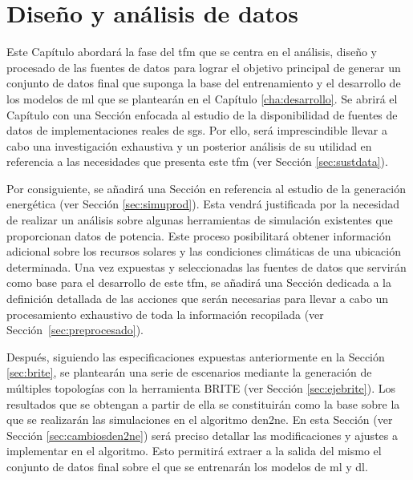 \chapter{Diseño y análisis de datos}
\label{cha:analisis}

Este Capítulo abordará la fase del \gls{tfm} que se centra en el análisis, diseño y procesado de las fuentes de datos para lograr el objetivo principal de generar un conjunto de datos final que suponga la base del entrenamiento y el desarrollo de los modelos de \gls{ml} que se plantearán en el Capítulo \ref{cha:desarrollo}. Se abrirá el Capítulo con una Sección enfocada al estudio de la disponibilidad de fuentes de datos de implementaciones reales de \gls{sg}s. Por ello, será imprescindible llevar a cabo una investigación exhaustiva y un posterior análisis de su utilidad en referencia a las necesidades que presenta este \gls{tfm} (ver Sección \ref{sec:sustdata}).

\vspace{3mm}

Por consiguiente, se añadirá una Sección en referencia al estudio de la generación energética (ver Sección \ref{sec:simuprod}). Esta vendrá justificada por la necesidad de realizar un análisis sobre algunas herramientas de simulación existentes que proporcionan datos de potencia. Este proceso posibilitará obtener información adicional sobre los recursos solares y las condiciones climáticas de una ubicación determinada. Una vez expuestas y seleccionadas las fuentes de datos que servirán como base para el desarrollo de este \gls{tfm}, se añadirá una Sección dedicada a la definición detallada de las acciones que serán necesarias para llevar a cabo un procesamiento exhaustivo de toda la información recopilada (ver Sección~\ref{sec:preprocesado}). 

\vspace{3mm}

Después, siguiendo las especificaciones expuestas anteriormente en la Sección \ref{sec:brite}, se plantearán una serie de escenarios mediante la generación de múltiples topologías con la herramienta BRITE (ver Sección \ref{sec:ejebrite}). Los resultados que se obtengan a partir de ella se constituirán como la base sobre la que se realizarán las simulaciones en el algoritmo \gls{den2ne}. En esta Sección (ver Sección \ref{sec:cambiosden2ne}) será preciso detallar las modificaciones y ajustes a implementar en el algoritmo. Esto permitirá extraer a la salida del mismo el conjunto de datos final sobre el que se entrenarán los modelos de \gls{ml} y \gls{dl}.

